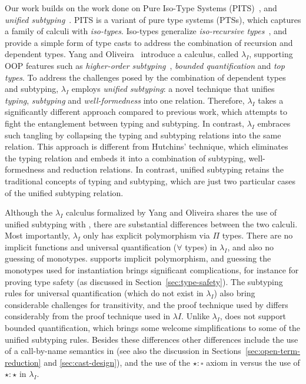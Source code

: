 Our work builds on the work done on Pure Iso-Type Systems (PITS)~\citep{yang2019pure}, and
\emph{unified subtyping}~\citep{full}. PITS is a variant of pure type systems (PTSs),
which captures a family of calculi with \emph{iso-types}.
Iso-types generalize \emph{iso-recursive
types}~\citep{tapl}, and provide a simple form of
type casts to address the combination of recursion and
dependent types.
Yang and Oliveira~\citep{full} introduce a calculus, called $\lambda_{I}$, supporting OOP features such as
\emph{higher-order subtyping}~\citep{fsubo}, \emph{bounded quantification} and
\emph{top types}.
To address the challenges posed by
the combination of dependent types and subtyping, $\lambda_{I}$
employs \emph{unified subtyping}: a novel technique that unifies
\emph{typing}, \emph{subtyping} and \emph{well-formedness} into one
relation. Therefore, $\lambda_{I}$ takes a significantly different
approach compared to previous work, which
attempts to fight the entanglement between typing and subtyping. In
contrast, $\lambda_{I}$ embraces such
tangling by collapsing the typing and subtyping
relations into the same relation. This approach is different from
Hutchins' technique, which eliminates the typing relation and embeds it into
a combination of subtyping, well-formedness and reduction relations.
In contrast, unified subtyping
retains the traditional concepts of typing and subtyping, which are just two
particular cases of the unified subtyping relation.

Although the $\lambda_{I}$ calculus formalized by Yang and Oliveira shares the use
of unified subtyping with \name, there are substantial differences between the two calculi.
Most importantly, $\lambda_{I}$ only has explicit polymorphism via $\Pi$ types. There
are no implicit functions and universal quantification ($\forall$ types) in $\lambda_{I}$,
and also no guessing of monotypes. \name supports implicit polymorphism, and
guessing the monotypes used for instantiation brings significant complications, for instance
for proving type safety (as discussed in Section~\ref{sec:type-safety}).
The subtyping rules for universal quantification (which do not exist in $\lambda_{I}$) also
bring considerable challenges for transitivity, and the proof technique used by
\name differs considerably from the proof technique used in $\lambda{I}$.
Unlike $\lambda_{I}$, \name does not support bounded quantification, which brings
some welcome simplifications to some of the unified subtyping rules.
Besides these differences other differences include the use of a call-by-name
semantics in \name (see also the discussion in Sections~\ref{sec:open-term-reduction} and \ref{sec:cast-design}),
and the use of the $\star : \square$ axiom in \name versus the use of $\star : \star$
in $\lambda_{I}$.

